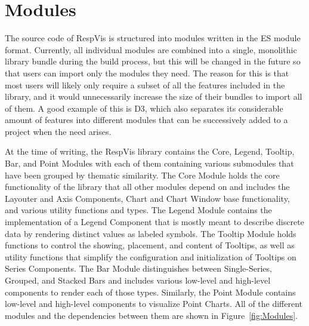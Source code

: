 \chapter{Modules}
\label{chap:Modules}

The source code of RespVis is structured into modules written in the ES module format.
Currently, all individual modules are combined into a single, monolithic library bundle during the build process, but this will be changed in the future so that users can import only the modules they need.
The reason for this is that most users will likely only require a subset of all the features included in the library, and it would unnecessarily increase the size of their bundles to import all of them.
A good example of this is D3, which also separates its considerable amount of features into different modules that can be successively added to a project when the need arises.

At the time of writing, the RespVis library contains the Core, Legend, Tooltip, Bar, and Point Modules with each of them containing various submodules that have been grouped by thematic similarity.
The Core Module holds the core functionality of the library that all other modules depend on and includes the Layouter and Axis Components, Chart and Chart Window base functionality, and various utility functions and types.
The Legend Module contains the implementation of a Legend Component that is mostly meant to describe discrete data by rendering distinct values as labeled symbols.
The Tooltip Module holds functions to control the showing, placement, and content of Tooltips, as well as utility functions that simplify the configuration and initialization of Tooltips on Series Components.
The Bar Module distinguishes between Single-Series, Grouped, and Stacked Bars and includes various low-level and high-level components to render each of those types.
Similarly, the Point Module contains low-level and high-level components to visualize Point Charts.
All of the different modules and the dependencies between them are shown in Figure~\ref{fig:Modules}.

